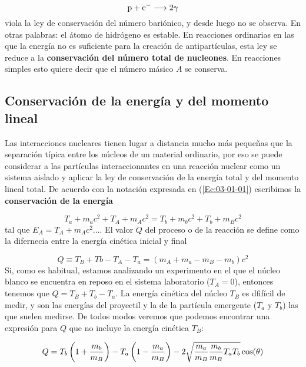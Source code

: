 \begin{equation}
    \text{p} + \text{e}^- \longrightarrow  2 \gamma
\end{equation}
viola la ley de conservación del número bariónico, y desde luego no se observa. En otras palabras: el átomo de hidrógeno es estable. En reacciones ordinarias en las que la energía no es suficiente para la creación de antipartículas, esta ley se reduce a la \textbf{conservación del número total de nucleones}. En reacciones simples esto quiere decir que el número másico $A$ se conserva.

\subsection{Conservación de la energía y del momento lineal}

Las interacciones nucleares tienen lugar a distancia mucho más pequeñas que la separación típica entre los núcleos de un material ordinario, por eso se puede considerar a las partículas interaccionantes en una reacción nuclear como un sistema aislado y aplicar la ley de conservación de la energía total y del momento lineal total. De acuerdo con la notación expresada en (\ref{Ec:03-01-01}) escribimos la \textbf{conservación de la energía}

\begin{equation}
    T_a + m_a c^2 +T_A+m_A c^2 = T_b +m_bc^2 + T_b + m_Bc^2
\end{equation}
tal que $E_A = T_A + m_Ac^2\ldots$. El valor $Q$ del proceso o de la reacción se define como la difernecia entre la energía cinética inicial y final 

\begin{equation}
    Q \equiv T_B + Tb - T_A - T_a = (m_A + m_a - m_B - m_b) c^2
\end{equation}
Si, como es habitual, estamos analizando un experimento en el que el núcleo blanco se encuentra en reposo en el sistema laboratorio ($T_A=0$), entonces tenemos que $Q = T_B + T_b - T_a$. La energía cinética del núcleo $T_B$ es dfifícil de medir, y son las energías del proyectil y la de la partícula emergente ($T_a$ y $T_b$) las que suelen medirse. De todos modos veremos que podemos encontrar una expresión para $Q$ que no incluye la energía cinética $T_B$:
\begin{mybox}
\begin{equation}
	Q = T_b \left( 1+\frac{m_b}{m_B} \right) - T_a \left( 1-\frac{m_a}{m_B} \right) - 2 \sqrt{\frac{m_a}{m_B} \frac{m_b}{m_B} T_a T_b} \cos (\theta)
\end{equation}
\end{mybox}

